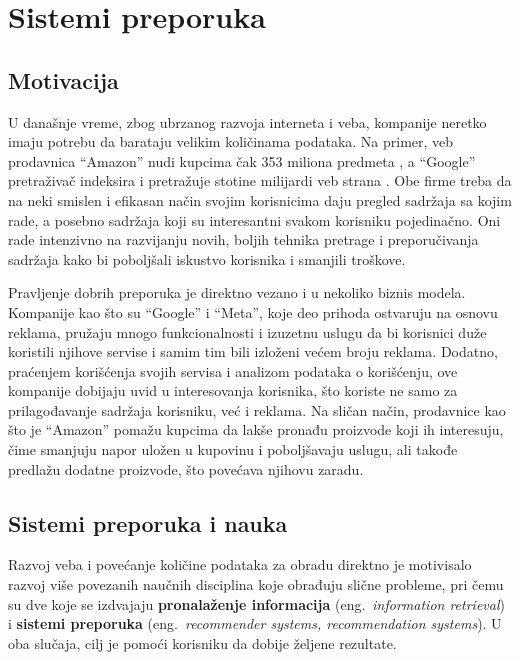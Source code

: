\documentclass[a4paper]{article}
\begin{document}
\section{Sistemi preporuka}
\label{sec:sistemi_preporuka}

\subsection{Motivacija}
\label{subsec:motivacija}

U današnje vreme, zbog ubrzanog razvoja interneta i veba, kompanije neretko imaju potrebu da barataju velikim količinama podataka. Na primer, veb prodavnica ``Amazon'' nudi kupcima čak 353 miliona predmeta \cite{noauthor_57_2022}, a ``Google'' pretraživač indeksira i pretražuje stotine milijardi veb strana \cite{noauthor_organizing_nodate}. Obe firme treba da na neki smislen i efikasan način svojim korisnicima daju pregled sadržaja sa kojim rade, a posebno sadržaja koji su interesantni svakom korisniku pojedinačno. Oni rade intenzivno na razvijanju novih, boljih tehnika pretrage i preporučivanja sadržaja kako bi poboljšali iskustvo korisnika i smanjili troškove.

Pravljenje dobrih preporuka je direktno vezano i u nekoliko biznis modela. Kompanije kao što su ``Google'' i ``Meta'', koje deo prihoda ostvaruju na osnovu reklama, pružaju mnogo funkcionalnosti i izuzetnu uslugu da bi korisnici duže koristili njihove servise i samim tim bili izloženi većem broju reklama. Dodatno, praćenjem korišćenja svojih servisa i analizom podataka o korišćenju, ove kompanije dobijaju uvid u interesovanja korisnika, što koriste ne samo za prilagođavanje sadržaja korisniku, već i reklama. Na sličan način, prodavnice kao što je ``Amazon'' pomažu kupcima da lakše pronađu proizvode koji ih interesuju, čime smanjuju napor uložen u kupovinu i poboljšavaju uslugu, ali takođe predlažu dodatne proizvode, što povećava njihovu zaradu.

\subsection{Sistemi preporuka i nauka}
\label{subsec:nauka}

Razvoj veba i povećanje količine podataka za obradu direktno je motivisalo razvoj više povezanih naučnih disciplina koje obrađuju slične probleme, pri čemu su dve koje se izdvajaju \textbf{pronalaženje informacija} (eng.~{\em information retrieval}) i \textbf{sistemi preporuka} (eng.~{\em recommender systems, recommendation systems}). U oba slučaja, cilj je pomoći korisniku da dobije željene rezultate.
\end{document}
